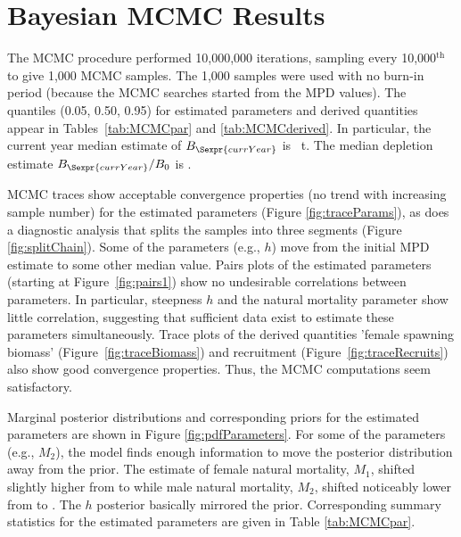 \section{Bayesian MCMC Results}

The MCMC procedure performed 10,000,000 iterations, sampling every 10,000$^\mathrm{th}$ to give 1,000 MCMC samples.  The 1,000 samples were used with no burn-in period (because the MCMC searches started from the MPD values). The quantiles (0.05, 0.50, 0.95) for estimated parameters and derived quantities appear in Tables~\ref{tab:MCMCpar} and \ref{tab:MCMCderived}. In particular, the current year median estimate of $B_{\Sexpr{currYear}}$ is ~t. The median depletion estimate $B_{\Sexpr{currYear}}/B_0$ is  .

MCMC traces show acceptable convergence properties (no trend with increasing sample number) for the estimated parameters (Figure \ref{fig:traceParams}), as does a diagnostic analysis that splits the samples into three segments (Figure \ref{fig:splitChain}). Some of the parameters (e.g., $h$) move from the initial MPD estimate to some other median value.  Pairs plots of the estimated parameters (starting at Figure~\ref{fig:pairs1}) show no undesirable correlations between parameters.  In particular, steepness $h$ and the natural mortality parameter show little correlation, suggesting that sufficient data exist to estimate these parameters simultaneously.  Trace plots of the derived quantities 'female spawning biomass' (Figure~\ref{fig:traceBiomass}) and recruitment (Figure~\ref{fig:traceRecruits}) also show good convergence properties.  Thus, the MCMC computations seem satisfactory.

Marginal posterior distributions and corresponding priors for the estimated parameters are shown in Figure \ref{fig:pdfParameters}. For some of the parameters (e.g., $M_2$), the model finds enough information to move the posterior distribution away from the prior. The estimate of female natural mortality, $M_1$, shifted slightly higher from  to  while male natural mortality, $M_2$, shifted noticeably lower from  to . The $h$ posterior basically mirrored the prior. Corresponding summary statistics for the estimated parameters are given in Table \ref{tab:MCMCpar}.

